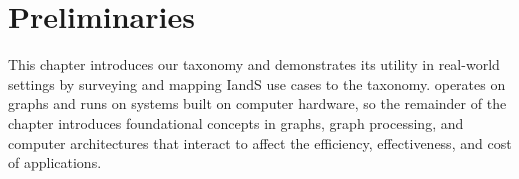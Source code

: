 \renewcommand{\thechapter}{2}
\chapter{Preliminaries}
\label{chapter:20-Preliminaries}

This chapter introduces our \gai taxonomy and demonstrates its utility in real-world settings by surveying and mapping \ac{IandS} use cases to the taxonomy.
\gai operates on graphs and runs on systems built on computer hardware, so the remainder of the chapter introduces foundational concepts in graphs, graph processing, and computer architectures that interact to affect the efficiency, effectiveness, and cost of \gai applications. 





% 


